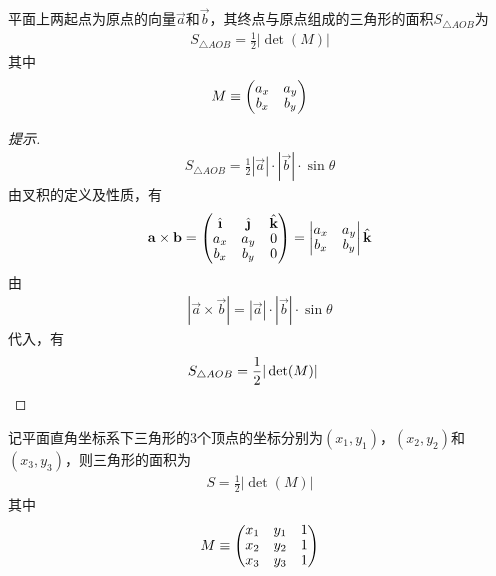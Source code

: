 \begin{lemma}
  平面上两起点为原点的向量$\vec a$和$\vec b$，其终点与原点组成的三角形的面积$S_{\triangle AOB}$为
  \begin{align*}
    S_{\triangle AOB} = \frac12\left| \det(M) \right|
  \end{align*}
  其中
  \begin{align*}\renewcommand{\arraystretch}{.9}
    M\equiv\begin{pmatrix}a_x & a_y\\ b_x & b_y\end{pmatrix}
  \end{align*}
\end{lemma}
\begin{proof}[提示]
  \begin{align*}
    S_{\triangle AOB} = \frac12 |\vec a| \cdot |\vec b| \cdot \sin\theta
  \end{align*}
  由叉积的定义及性质，有
  \begin{align*}\renewcommand{\arraystretch}{.9}
    \vec a\times \vec b = 
    \begin{pmatrix}
      \ihat & \jhat & \khat\\
      a_x   & a_y   & 0\\
      b_x   & b_y   & 0
    \end{pmatrix} =
    \begin{vmatrix}
      a_x   & a_y\\
      b_x   & b_y
    \end{vmatrix}\khat
  \end{align*}
  由
  \begin{align*}
    \left|\vec a\times \vec b\right| = |\vec a|\cdot|\vec b|\cdot\sin\theta
  \end{align*}
  代入，有
  \begin{align*}
    S_{\triangle AOB} = \frac12 |\det(M)|&\qedhere
  \end{align*}
\end{proof}



\begin{theorem}[三角形面积的行列式公式]
  记平面直角坐标系下三角形的3个顶点的坐标分别为$(x_1, y_1)$，$(x_2,y_2)$和$(x_3,y_3)$，则三角形的面积为
  \begin{align*}
    S =\frac12 \left| \det(M) \right|
  \end{align*}
  其中
  \begin{align*}\renewcommand{\arraystretch}{.9}
    M\equiv
    \begin{pmatrix}
      x_1 & y_1 & 1\\
      x_2 & y_2 & 1\\
      x_3 & y_3 & 1
    \end{pmatrix}
  \end{align*}
\end{theorem}


